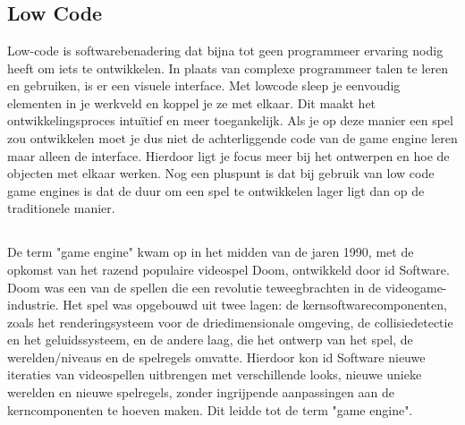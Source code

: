 \chapter{}%
\label{ch:stand-van-zaken}


\section{Low Code}
Low-code is softwarebenadering dat bijna tot geen programmeer ervaring nodig heeft om iets te ontwikkelen. In plaats van complexe programmeer talen te leren en gebruiken, is er een visuele interface.\autocite{Kissflow2024} Met lowcode sleep je eenvoudig elementen in je werkveld en koppel je ze met elkaar. Dit maakt het ontwikkelingsproces intuïtief en meer toegankelijk. Als je op deze manier een spel zou ontwikkelen moet je dus niet de achterliggende code van de game engine leren maar alleen de interface. Hierdoor ligt je focus meer bij het ontwerpen en hoe de objecten met elkaar werken. Nog een pluspunt is dat bij gebruik van low code game engines is dat de duur om een spel te ontwikkelen lager ligt dan op de traditionele manier.

\section{}%
\label{sec:game-engines}
De term "game engine" kwam op in het midden van de jaren 1990, met de opkomst van het razend populaire videospel Doom, ontwikkeld door id Software. Doom was een van de spellen die een revolutie teweegbrachten in de videogame-industrie. Het spel was opgebouwd uit twee lagen: de kernsoftwarecomponenten, zoals het renderingsysteem voor de driedimensionale omgeving, de collisiedetectie en het geluidssysteem, en de andere laag, die het ontwerp van het spel, de werelden/niveaus en de spelregels omvatte. Hierdoor kon id Software nieuwe iteraties van videospellen uitbrengen met verschillende looks, nieuwe unieke werelden en nieuwe spelregels, zonder ingrijpende aanpassingen aan de kerncomponenten te hoeven maken. Dit leidde tot de term "game engine". \cite{gregory2018game}

